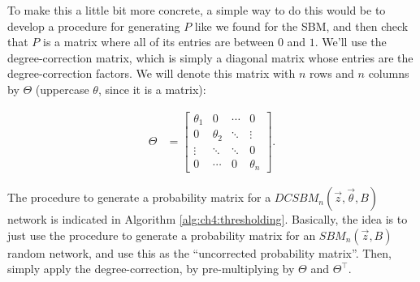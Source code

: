 To make this a little bit more concrete, a simple way to do this would be to develop a procedure for generating $P$ like we found for the SBM, and then check that $P$ is a matrix where all of its entries are between $0$ and $1$. We'll use the degree-correction matrix, which is simply a diagonal matrix whose entries are the degree-correction factors. We will denote this matrix with $n$ rows and $n$ columns by $\Theta$ (uppercase $\theta$, since it is a matrix):

\begin{align}
    \Theta &= \begin{bmatrix}
        \theta_1 & 0 & \cdots & 0 \\
        0 & \theta_2 & \ddots & \vdots \\
        \vdots & \ddots & \ddots & 0 \\
        0 & \cdots & 0 & \theta_n
    \end{bmatrix}.
    \label{eqn:ch5:dcsbm:Theta}
\end{align}

The procedure to generate a probability matrix for a $DCSBM_n(\vec z, \vec\theta, B)$ network is indicated in Algorithm \ref{alg:ch4:thresholding}. Basically, the idea is to just use the procedure to generate a probability matrix for an $SBM_n(\vec z, B)$ random network, and use this as the ``uncorrected probability matrix''. Then, simply apply the degree-correction, by pre-multiplying by $\Theta$ and $\Theta^\top$. 

